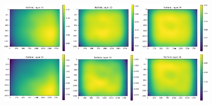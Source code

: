 \documentclass[letterpaper,11pt]{article}
\begin{document}
\begin{figure}[!ht]
\centering
\includegraphics[width=0.32\textwidth]{images/methods/flatfield_layers_polaris/flatfield_layer_21}
\includegraphics[width=0.32\textwidth]{images/methods/flatfield_layers_polaris/flatfield_layer_25}
\includegraphics[width=0.32\textwidth]{images/methods/flatfield_layers_polaris/flatfield_layer_29}
\includegraphics[width=0.32\textwidth]{images/methods/flatfield_layers_polaris/flatfield_layer_30}
\includegraphics[width=0.32\textwidth]{images/methods/flatfield_layers_polaris/flatfield_layer_33}
\includegraphics[width=0.32\textwidth]{images/methods/flatfield_layers_polaris/flatfield_layer_36}

\end{figure}
\end{document}
